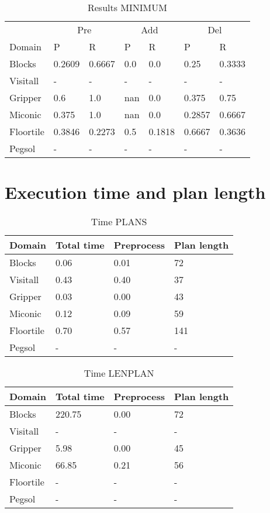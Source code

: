 \documentclass[]{article}
\begin{document}
\begin{table}
	\caption{Results MINIMUM}
	\label{tab:results_minimum}
	\begin{center}
		\begin{tabular}{l|l|l|l|l|l|l|}
			& \multicolumn{2}{|c|}{Pre} & \multicolumn{2}{|c|}{Add} & \multicolumn{2}{|c|}{Del}  \\ \cline{2-7}			 
			Domain & P & R & P & R & P & R \\
			\hline
			Blocks & 0.2609 & 0.6667 & 0.0 & 0.0 & 0.25 & 0.3333 \\
			Visitall & - & - & - & - & - & - \\
			Gripper & 0.6 & 1.0 & nan & 0.0 & 0.375 & 0.75 \\
			Miconic & 0.375 & 1.0 & nan & 0.0 & 0.2857 & 0.6667 \\
			Floortile & 0.3846 & 0.2273 & 0.5 & 0.1818 & 0.6667 & 0.3636 \\
			Pegsol & - & - & - & - & - & - \\
		\end{tabular}
	\end{center}	
\end{table}


\section{Execution time and plan length}
\begin{table}
	\caption{Time PLANS}
	\label{tab:time_plans}
	\begin{center}
		\begin{tabular}{l|l|l|l|}			 
			Domain & Total time & Preprocess & Plan length  \\
			\hline
			Blocks & 0.06 & 0.01 & 72  \\
			Visitall & 0.43 & 0.40 & 37 \\
			Gripper & 0.03 & 0.00 & 43  \\
			Miconic & 0.12 & 0.09 & 59  \\
			Floortile & 0.70 & 0.57 & 141 \\
			Pegsol & - & - & - \\
		\end{tabular}
	\end{center}	
\end{table}

\begin{table}
	\caption{Time LENPLAN}
	\label{tab:time_lenplan}
	\begin{center}
		\begin{tabular}{l|l|l|l|}			 
			Domain & Total time & Preprocess & Plan length  \\
			\hline
			Blocks & 220.75 & 0.00 & 72  \\
			Visitall & - & - & -  \\
			Gripper & 5.98 & 0.00 & 45  \\
			Miconic & 66.85 & 0.21 & 56  \\
			Floortile & - & - & - \\
			Pegsol & - & - & - \\
		\end{tabular}
	\end{center}	
\end{table}
\end{document}
